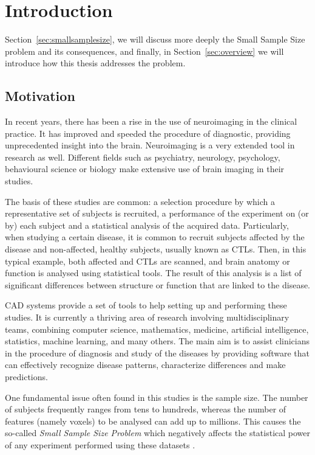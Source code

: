 \chapter{Introduction}\label{ch:introduction}

 Section~\ref{sec:smallsamplesize}, we will discuss more deeply the Small Sample Size problem and its consequences, 
and finally, in Section~\ref{sec:overview} we will introduce how this thesis addresses the problem. 

\section{Motivation}
In recent years, there has been a rise in the use of neuroimaging in the clinical practice. It has improved and speeded the procedure of diagnostic, providing unprecedented insight into the brain. Neuroimaging is a very extended tool in research as well. Different fields such as psychiatry, neurology, psychology, behavioural science or biology make extensive use of brain imaging in their studies. 

The basis of these studies are common: a selection procedure by which a representative set of subjects is recruited, a performance of the experiment on (or by) each subject and a statistical analysis of the acquired data. Particularly, when studying a certain disease, it is common to recruit subjects affected by the disease and non-affected, healthy subjects, usually known as \acp{CTL}. Then, in this typical example, both affected and \acp{CTL} are scanned, and brain anatomy or function is analysed using statistical tools. The result of this analysis is a list of significant differences between structure or function that are linked to the disease. 

\ac{CAD} systems provide a set of tools to help setting up and performing these studies. It is currently a thriving area of research involving multidisciplinary teams, combining computer science, mathematics, medicine, artificial intelligence, statistics, machine learning, and many others. The main aim is to assist clinicians in the procedure of diagnosis and study of the diseases by providing software that can effectively recognize disease patterns, characterize differences and make predictions. 
\cite{Martinez-Murcia2016}

One fundamental issue often found in this studies is the sample size. The number of subjects frequently ranges from tens to hundreds, whereas the number of features (namely voxels) to be analysed can add up to millions. This causes the so-called \emph{Small Sample Size Problem} \cite{Duin2000} which negatively affects the statistical power of any experiment performed using these datasets \cite{Button2013}. 


